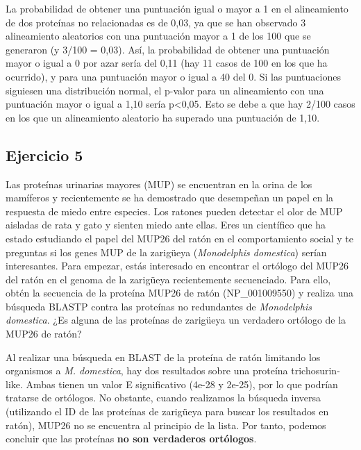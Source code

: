 La probabilidad de obtener una puntuación igual o mayor a 1 en el alineamiento de dos proteínas no relacionadas es de 0,03, ya que se han observado 3 alineamiento aleatorios con una puntuación mayor a 1 de los 100 que se generaron (y 3/100 = 0,03). Así, la probabilidad de obtener una puntuación mayor o igual a 0 por azar sería del 0,11 (hay 11 casos de 100 en los que ha ocurrido), y para una puntuación mayor o igual a 40 del 0. Si las puntuaciones siguiesen una distribución normal, el p-valor para un alineamiento con una puntuación mayor o igual a 1,10 sería p<0,05. Esto se debe a que hay 2/100 casos en los que un alineamiento aleatorio ha superado una puntuación de 1,10.

\subsection{Ejercicio 5}
Las proteínas urinarias mayores (MUP) se encuentran en la orina de los mamíferos y recientemente se ha demostrado que desempeñan un papel en la respuesta de miedo entre especies. Los ratones pueden detectar el olor de MUP aisladas de rata y gato y sienten miedo ante ellas.
Eres un científico que ha estado estudiando el papel del MUP26 del ratón en el comportamiento social y te preguntas si los genes MUP de la zarigüeya (\textit{Monodelphis domestica}) serían interesantes. Para empezar, estás interesado en encontrar el ortólogo del MUP26 del ratón en el genoma de la zarigüeya recientemente secuenciado.
Para ello, obtén la secuencia de la proteína MUP26 de ratón (NP\_001009550) y realiza una búsqueda BLASTP contra las proteínas no redundantes de \textit{Monodelphis domestica}. ¿Es alguna de las proteínas de zarigüeya un verdadero ortólogo de la MUP26 de ratón?

Al realizar una búsqueda en BLAST de la proteína de ratón limitando los organismos a \textit{M. domestica}, hay dos resultados sobre una proteína trichosurin-like. Ambas tienen un valor E significativo (4e-28 y 2e-25), por lo que podrían tratarse de ortólogos. No obstante, cuando realizamos la búsqueda inversa (utilizando el ID de las proteínas de zarigüeya para buscar los resultados en ratón), MUP26 no se encuentra al principio de la lista. Por tanto, podemos concluir que las proteínas \textbf{no son verdaderos ortólogos}.